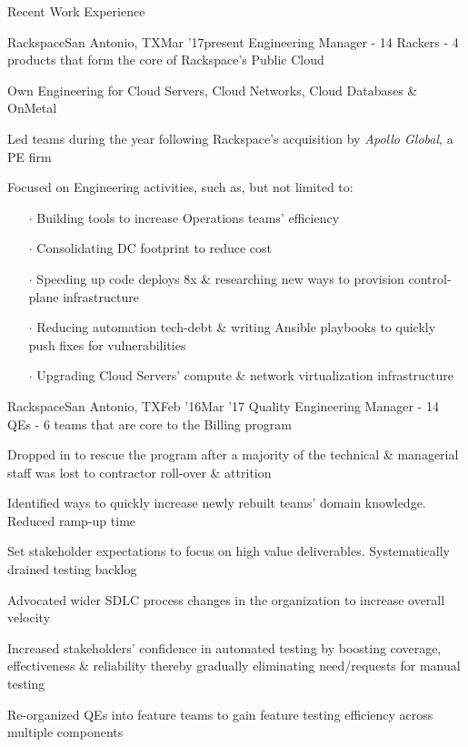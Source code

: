 \documentclass{resume} %
\begin{document}
\begin{rSection}{Recent Work Experience}

\begin{rSubsection}{Rackspace}{San Antonio, TX}{Mar '17}{present}
{Engineering Manager - 14 Rackers - 4 products that form the core of Rackspace's Public Cloud}
  
\item Own Engineering for Cloud Servers, Cloud Networks, Cloud Databases \& OnMetal
\item Led teams during the year following Rackspace's acquisition by {\em Apollo Global}, a PE firm
\item Focused on Engineering activities, such as, but not limited to:
  \vspace{-0.5em}
  \begin{itemize}  \itemsep0.5pt \parskip0pt
    \item[$\cdot$] Building tools to increase Operations teams' efficiency
    \item[$\cdot$] Consolidating DC footprint to reduce cost
    \item[$\cdot$] Speeding up code deploys 8x \& researching new ways to provision control-plane infrastructure
    \item[$\cdot$] Reducing automation tech-debt \& writing Ansible playbooks to quickly push fixes for vulnerabilities
    \item[$\cdot$] Upgrading Cloud Servers' compute \& network virtualization infrastructure
\end{itemize}
  
\end{rSubsection}
  
\begin{rSubsection}{Rackspace}{San Antonio, TX}{Feb '16}{Mar '17}
{Quality Engineering Manager - 14 QEs - 6 teams that are core to the Billing program}
  
\item Dropped in to rescue the program after a majority of the technical \& managerial staff was lost to contractor roll-over \& attrition
\item Identified ways to quickly increase newly rebuilt teams' domain knowledge. Reduced ramp-up time
\item Set stakeholder expectations to focus on high value deliverables. Systematically drained testing backlog
\item Advocated wider SDLC process changes in the organization to increase overall velocity
\item Increased stakeholders' confidence in automated testing by boosting coverage, effectiveness \& reliability thereby gradually eliminating need/requests for manual testing
\item Re-organized QEs into feature teams to gain feature testing efficiency across multiple components
  

\end{rSubsection}
\end{rSection}
\end{document}
